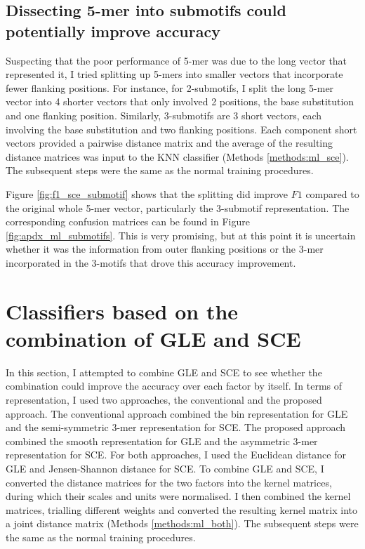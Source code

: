 

\subsection{Dissecting 5-mer into submotifs could potentially improve accuracy}
Suspecting that the poor performance of 5-mer was due to the long vector that represented it, I tried splitting up 5-mers into smaller vectors that incorporate fewer flanking positions. For instance, for 2-submotifs, I split the long 5-mer vector into 4 shorter vectors that only involved 2 positions, the base substitution and one flanking position. Similarly, 3-submotifs are 3 short vectors, each involving the base substitution and two flanking positions. Each component short vectors provided a pairwise distance matrix and the average of the resulting distance matrices was input to the KNN classifier (Methods \ref{methods:ml_sce}). The subsequent steps were the same as the normal training procedures.

Figure \ref{fig:f1_sce_submotif} shows that the splitting did improve $F1$ compared to the original whole 5-mer vector, particularly the 3-submotif representation. The corresponding confusion matrices can be found in Figure \ref{fig:apdx_ml_submotifs}. This is very promising, but at this point it is uncertain whether it was the information from outer flanking positions or the 3-mer incorporated in the 3-motifs that drove this accuracy improvement.



\section{Classifiers based on the combination of GLE and SCE}\label{ml:both}
In this section, I attempted to combine GLE and SCE to see whether the combination could improve the accuracy over each factor by itself. In terms of representation, I used two approaches, the conventional and the proposed approach. The conventional approach combined the bin representation for GLE and the semi-symmetric 3-mer representation for SCE. The proposed approach combined the smooth representation for GLE and the asymmetric 3-mer representation for SCE. For both approaches, I used the Euclidean distance for GLE and Jensen-Shannon distance for SCE. To combine GLE and SCE, I converted the distance matrices for the two factors into the kernel matrices, during which their scales and units were normalised. I then combined the kernel matrices, trialling different weights and converted the resulting kernel matrix into a joint distance matrix (Methods \ref{methods:ml_both}). The subsequent steps were the same as the normal training procedures.

